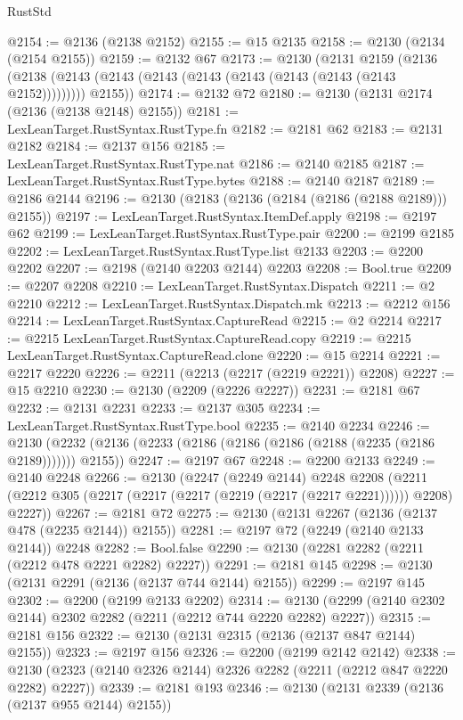 \begin{lexlean}{RustStd}
\begin{coremodule}
@2154 := @2136 (@2138 @2152)
@2155 := @15 @2135
@2158 := @2130 (@2134 (@2154 @2155))
@2159 := @2132 @67
@2173 := @2130
    (@2131
      @2159
      (@2136 (@2138 (@2143 (@2143 (@2143 (@2143 (@2143 (@2143 (@2143 (@2143 @2152))))))))) @2155))
@2174 := @2132 @72
@2180 := @2130 (@2131 @2174 (@2136 (@2138 @2148) @2155))
@2181 := LexLeanTarget.RustSyntax.RustType.fn
@2182 := @2181 @62
@2183 := @2131 @2182
@2184 := @2137 @156
@2185 := LexLeanTarget.RustSyntax.RustType.nat
@2186 := @2140 @2185
@2187 := LexLeanTarget.RustSyntax.RustType.bytes
@2188 := @2140 @2187
@2189 := @2186 @2144
@2196 := @2130 (@2183 (@2136 (@2184 (@2186 (@2188 @2189))) @2155))
@2197 := LexLeanTarget.RustSyntax.ItemDef.apply
@2198 := @2197 @62
@2199 := LexLeanTarget.RustSyntax.RustType.pair
@2200 := @2199 @2185
@2202 := LexLeanTarget.RustSyntax.RustType.list @2133
@2203 := @2200 @2202
@2207 := @2198 (@2140 @2203 @2144) @2203
@2208 := Bool.true
@2209 := @2207 @2208
@2210 := LexLeanTarget.RustSyntax.Dispatch
@2211 := @2 @2210
@2212 := LexLeanTarget.RustSyntax.Dispatch.mk
@2213 := @2212 @156
@2214 := LexLeanTarget.RustSyntax.CaptureRead
@2215 := @2 @2214
@2217 := @2215 LexLeanTarget.RustSyntax.CaptureRead.copy
@2219 := @2215 LexLeanTarget.RustSyntax.CaptureRead.clone
@2220 := @15 @2214
@2221 := @2217 @2220
@2226 := @2211 (@2213 (@2217 (@2219 @2221)) @2208)
@2227 := @15 @2210
@2230 := @2130 (@2209 (@2226 @2227))
@2231 := @2181 @67
@2232 := @2131 @2231
@2233 := @2137 @305
@2234 := LexLeanTarget.RustSyntax.RustType.bool
@2235 := @2140 @2234
@2246 := @2130 (@2232 (@2136 (@2233 (@2186 (@2186 (@2186 (@2188 (@2235 (@2186 @2189))))))) @2155))
@2247 := @2197 @67
@2248 := @2200 @2133
@2249 := @2140 @2248
@2266 := @2130
    (@2247
      (@2249 @2144)
      @2248
      @2208
      (@2211 (@2212 @305 (@2217 (@2217 (@2217 (@2219 (@2217 (@2217 @2221)))))) @2208) @2227))
@2267 := @2181 @72
@2275 := @2130 (@2131 @2267 (@2136 (@2137 @478 (@2235 @2144)) @2155))
@2281 := @2197 @72 (@2249 (@2140 @2133 @2144)) @2248
@2282 := Bool.false
@2290 := @2130 (@2281 @2282 (@2211 (@2212 @478 @2221 @2282) @2227))
@2291 := @2181 @145
@2298 := @2130 (@2131 @2291 (@2136 (@2137 @744 @2144) @2155))
@2299 := @2197 @145
@2302 := @2200 (@2199 @2133 @2202)
@2314 := @2130 (@2299 (@2140 @2302 @2144) @2302 @2282 (@2211 (@2212 @744 @2220 @2282) @2227))
@2315 := @2181 @156
@2322 := @2130 (@2131 @2315 (@2136 (@2137 @847 @2144) @2155))
@2323 := @2197 @156
@2326 := @2200 (@2199 @2142 @2142)
@2338 := @2130 (@2323 (@2140 @2326 @2144) @2326 @2282 (@2211 (@2212 @847 @2220 @2282) @2227))
@2339 := @2181 @193
@2346 := @2130 (@2131 @2339 (@2136 (@2137 @955 @2144) @2155))

\end{coremodule}
\end{lexlean}

